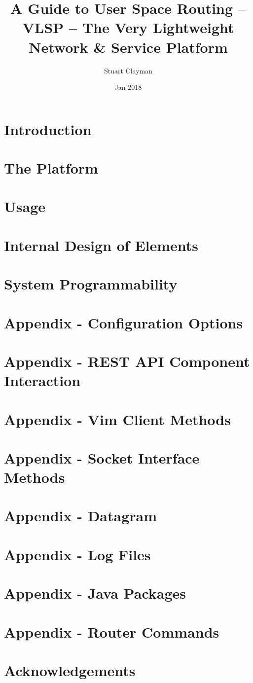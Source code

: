 \documentclass[a4paper,11pt]{article}
\renewcommand{\appendix}[1]{%
   \newpage \section{#1}%
}
\begin{document}
\title{A Guide to User Space Routing -- \\
VLSP -- The Very Lightweight Network \& Service Platform}
\date{Jan 2018}
\author{Stuart Clayman}


\maketitle




\section{Introduction}
\label{chap:intro}


\section{The Platform}
\label{chap:platform}


\section{Usage}
\label{chap:usage}


\section{Internal Design of Elements}
\label{chap:design}


\section{System Programmability}
\label{chap:programmability}


%

\appendix{Appendix - Configuration Options}
\label{chap:config}


\appendix{Appendix - REST API Component Interaction}
\label{chap:restapi}


\appendix{Appendix - Vim Client Methods}
\label{chap:vimclient}


\appendix{Appendix - Socket Interface Methods}
\label{chap:methods}


\appendix{Appendix - Datagram} 
\label{chap:datagram}


\appendix{Appendix - Log Files}
\label{chap:logfiles}


\appendix{Appendix - Java Packages}
\label{chap:packages}


\appendix{Appendix - Router Commands}
\label{chap:mcrp}



\appendix{Acknowledgements}



\newpage \tableofcontents
\end{document}
